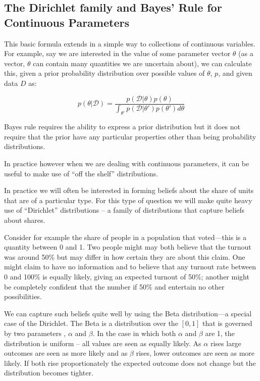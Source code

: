 \documentclass[12pt,]{book}
\begin{document}
\hypertarget{the-dirichlet-family-and-bayes-rule-for-continuous-parameters}{%
\subsection{The Dirichlet family and Bayes' Rule for Continuous Parameters}\label{the-dirichlet-family-and-bayes-rule-for-continuous-parameters}}

This basic formula extends in a simple way to collections of continuous variables. For example, say we are interested in the value of some parameter vector \(\theta\) (as a vector, \(\theta\) can contain many quantities we are uncertain about), we can calculate this, given a prior probability distribution over possible values of \(\theta\), \(p\), and given data \(D\) as:

\[p(\theta|\mathcal{D})=\frac{p(\mathcal{D}|\theta)p(\theta)}{\int_{\theta'}p(\mathcal{D|\theta'})p(\theta')d\theta}\]

Bayes rule requires the ability to express a prior distribution but it does not require that the prior have any particular properties other than being probability distributions.

In practice however when we are dealing with continuous parameters, it can be useful to make use of ``off the shelf'' distributions.

In practice we will often be interested in forming beliefs about the share of units that are of a particular type. For this type of question we will make quite heavy use of ``Dirichlet'' distributions -- a family of distributions that capture beliefs about shares.

Consider for example the share of people in a population that voted---this is a quantity between 0 and 1. Two people might may both believe that the turnout was around 50\% but may differ in how certain they are about this claim. One might claim to have no information and to believe that any turnout rate between 0 and 100\% is equally likely, giving an expected turnout of 50\%; another might be completely confident that the number if 50\% and entertain no other possibilities.

We can capture such beliefs quite well by using the Beta distribution---a special case of the Dirichlet. The Beta is a distribution over the \([0,1]\) that is governed by two parameters , \(\alpha\) and \(\beta\). In the case in which both \(\alpha\) and \(\beta\) are 1, the distribution is uniform -- all values are seen as equally likely. As \(\alpha\) rises large outcomes are seen as more likely and as \(\beta\) rises, lower outcomes are seen as more likely. If both rise proportionately the expected outcome does not change but the distribution becomes tighter.
\end{document}
